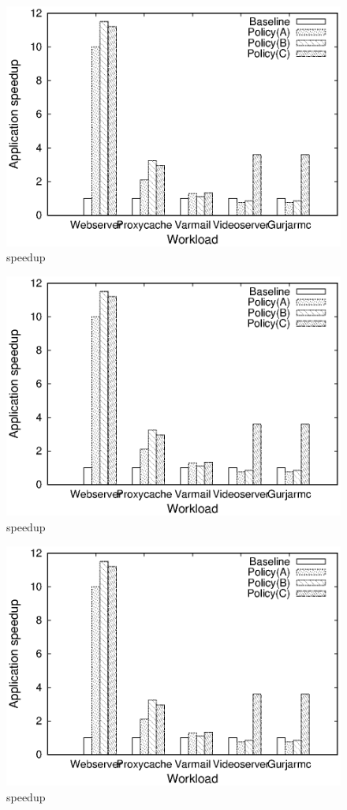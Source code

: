 \documentclass[a4paper, 10pt]{report}
\begin{document}
\begin{figure}
\centering
\includegraphics[width=\columnwidth]{speedup.eps}
 \caption{speedup}
 \label{fig:figr7}
\end{figure}



\begin{figure}
\centering
\includegraphics[width=\columnwidth]{speedup.eps}
 \caption{speedup}
 \label{fig:figr8}
\end{figure}



\begin{figure}
\centering
\includegraphics[width=\columnwidth]{speedup.eps}
 \caption{speedup}
 \label{fig:figr9}
\end{figure}
\end{document}

